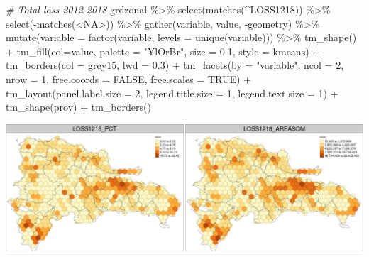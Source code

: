 \documentclass[10pt,landscape,a3paper]{article}
\newenvironment{Shaded}{\begin{snugshade}}{\end{snugshade}}
\newcommand{\AttributeTok}[1]{\textcolor[rgb]{0.77,0.63,0.00}{#1}}
\newcommand{\CommentTok}[1]{\textcolor[rgb]{0.56,0.35,0.01}{\textit{#1}}}
\newcommand{\ConstantTok}[1]{\textcolor[rgb]{0.00,0.00,0.00}{#1}}
\newcommand{\DecValTok}[1]{\textcolor[rgb]{0.00,0.00,0.81}{#1}}
\newcommand{\FloatTok}[1]{\textcolor[rgb]{0.00,0.00,0.81}{#1}}
\newcommand{\FunctionTok}[1]{\textcolor[rgb]{0.00,0.00,0.00}{#1}}
\newcommand{\NormalTok}[1]{#1}
\newcommand{\SpecialCharTok}[1]{\textcolor[rgb]{0.00,0.00,0.00}{#1}}
\newcommand{\StringTok}[1]{\textcolor[rgb]{0.31,0.60,0.02}{#1}}
\begin{document}
\begin{Shaded}
\begin{Highlighting}[]

\CommentTok{\# Total loss 2012{-}2018}
\NormalTok{grdzonal }\SpecialCharTok{\%\textgreater{}\%} \FunctionTok{select}\NormalTok{(}\FunctionTok{matches}\NormalTok{(}\StringTok{\textquotesingle{}\^{}LOSS1218\textquotesingle{}}\NormalTok{)) }\SpecialCharTok{\%\textgreater{}\%} \FunctionTok{select}\NormalTok{(}\SpecialCharTok{{-}}\FunctionTok{matches}\NormalTok{(}\StringTok{\textquotesingle{}\textless{}NA\textgreater{}\textquotesingle{}}\NormalTok{)) }\SpecialCharTok{\%\textgreater{}\%} 
  \FunctionTok{gather}\NormalTok{(variable, value, }\SpecialCharTok{{-}}\NormalTok{geometry) }\SpecialCharTok{\%\textgreater{}\%}
  \FunctionTok{mutate}\NormalTok{(}\AttributeTok{variable =} \FunctionTok{factor}\NormalTok{(variable, }\AttributeTok{levels =} \FunctionTok{unique}\NormalTok{(variable))) }\SpecialCharTok{\%\textgreater{}\%} 
  \FunctionTok{tm\_shape}\NormalTok{() }\SpecialCharTok{+}
    \FunctionTok{tm\_fill}\NormalTok{(}\AttributeTok{col=}\StringTok{\textquotesingle{}value\textquotesingle{}}\NormalTok{, }\AttributeTok{palette =} \StringTok{"YlOrBr"}\NormalTok{, }\AttributeTok{size =} \FloatTok{0.1}\NormalTok{, }\AttributeTok{style =} \StringTok{\textquotesingle{}kmeans\textquotesingle{}}\NormalTok{) }\SpecialCharTok{+}
    \FunctionTok{tm\_borders}\NormalTok{(}\AttributeTok{col =} \StringTok{\textquotesingle{}grey15\textquotesingle{}}\NormalTok{, }\AttributeTok{lwd =} \FloatTok{0.3}\NormalTok{) }\SpecialCharTok{+}
    \FunctionTok{tm\_facets}\NormalTok{(}\AttributeTok{by =} \StringTok{"variable"}\NormalTok{, }\AttributeTok{ncol =} \DecValTok{2}\NormalTok{, }\AttributeTok{nrow =} \DecValTok{1}\NormalTok{, }\AttributeTok{free.coords =} \ConstantTok{FALSE}\NormalTok{, }\AttributeTok{free.scales =} \ConstantTok{TRUE}\NormalTok{) }\SpecialCharTok{+}
    \FunctionTok{tm\_layout}\NormalTok{(}\AttributeTok{panel.label.size =} \DecValTok{2}\NormalTok{, }\AttributeTok{legend.title.size =} \DecValTok{1}\NormalTok{, }\AttributeTok{legend.text.size =} \DecValTok{1}\NormalTok{) }\SpecialCharTok{+}
  \FunctionTok{tm\_shape}\NormalTok{(prov) }\SpecialCharTok{+} \FunctionTok{tm\_borders}\NormalTok{()}
\end{Highlighting}
\end{Shaded}

\begin{center}\includegraphics{img/zonal-long-term-grid-10} \end{center}
\end{document}
